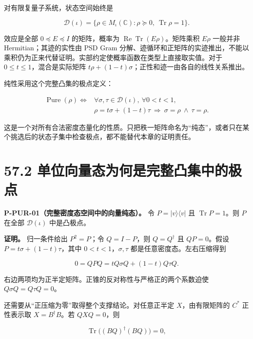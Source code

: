\documentclass[
  11pt,
  oneside]{book}
\begin{document}
对有限复量子系统，状态空间始终是

\[
\mathcal D(\iota)=\{\rho\in M_\iota(\mathbb C):\rho\succeq0,\ \operatorname{Tr}\rho=1\}.
\]

效应是全部 \(0\preceq E\preceq I\) 的矩阵，概率为
\(\operatorname{Re}\operatorname{Tr}(E\rho)\)。矩阵乘积 \(E\rho\)
一般并非 Hermitian；其迹的实性由 PSD Gram
分解、迹循环和正矩阵的实迹推出，不能以乘积仍为正来代替证明。实部约定使概率函数在类型上直接取实值。对于
\(0\le t\le1\)，混合是实际矩阵
\(t\rho+(1-t)\sigma\)；正性和迹一由各自的线性关系推出。

纯性采用这个完整凸集的极点定义：

\[
\begin{aligned}
\operatorname{Pure}(\rho)\iff{}&
\forall\sigma,\tau\in\mathcal D(\iota),\ \forall 0<t<1,\\
&\rho=t\sigma+(1-t)\tau
\ \Longrightarrow\ \sigma=\rho\ \land\ \tau=\rho.
\end{aligned}
\]

这是一个对所有合法密度态量化的性质。只把秩一矩阵命名为``纯态''，或者只在某个挑选后的状态子集中检查极点，都不能替代本章的证明责任。

\hypertarget{ux5355ux4f4dux5411ux91cfux6001ux4e3aux4f55ux662fux5b8cux6574ux51f8ux96c6ux4e2dux7684ux6781ux70b9}{%
\section{57.2
单位向量态为何是完整凸集中的极点}\label{ux5355ux4f4dux5411ux91cfux6001ux4e3aux4f55ux662fux5b8cux6574ux51f8ux96c6ux4e2dux7684ux6781ux70b9}}

\protect\hypertarget{p-pur-01}{}{}

\textbf{P-PUR-01（完整密度态空间中的向量纯态）。} 令
\(P=|v\rangle\langle v|\) 且 \(\operatorname{Tr}P=1\)。则 \(P\) 在全部
\(\mathcal D(\iota)\) 中是凸极点。

\textbf{证明。} 归一条件给出 \(P^2=P\)；令 \(Q=I-P\)，则 \(Q=Q^\dagger\)
且 \(QP=0\)。假设 \(P=t\sigma+(1-t)\tau\)，其中
\(0<t<1\)，\(\sigma,\tau\) 都是任意密度态。左右压缩得到

\[
0=QPQ=tQ\sigma Q+(1-t)Q\tau Q.
\]

右边两项均为正半定矩阵。正锥的反对称性与严格正的两个系数迫使
\(Q\sigma Q=Q\tau Q=0\)。

还需要从``正压缩为零''取得整个支撑结论。对任意正半定 \(X\)，由有限矩阵的
\(C^*\) 正性表示取 \(X=B^\dagger B\)。若 \(QXQ=0\)，则

\[
\operatorname{Tr}\bigl((BQ)^\dagger(BQ)\bigr)=0,
\]
\end{document}
